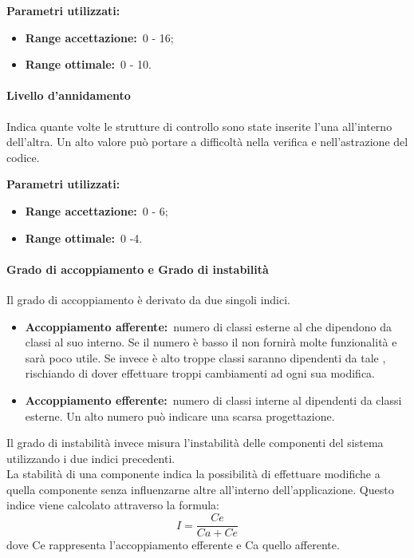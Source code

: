 				\textbf{Parametri utilizzati:}
				\begin{itemize}
					\item \textbf{Range accettazione:}\ 0 - 16;
					\item \textbf{Range ottimale:}\ 0 - 10.
				\end{itemize}
			\paragraph{Livello d'annidamento}
			\label{sec:3.7.3.4}
				Indica quante volte le strutture di controllo sono state inserite l'una all'interno dell'altra. Un alto valore può portare a difficoltà nella verifica e nell'astrazione del codice.
				
				\textbf{Parametri utilizzati:}
				\begin{itemize}
					\item \textbf{Range accettazione:}\ 0 - 6;
					\item \textbf{Range ottimale:}\ 0 -4.
				\end{itemize}
			\paragraph{Grado di accoppiamento e Grado di instabilità}
			\label{sec:3.7.3.5}
				Il grado di accoppiamento è derivato da due singoli indici.
				\begin{itemize}
					\item \textbf{Accoppiamento afferente:}\ numero di classi esterne al  che dipendono da classi al suo interno. Se il numero è basso il  non fornirà molte funzionalità e sarà poco utile. Se invece è alto troppe classi saranno dipendenti da tale , rischiando di dover effettuare troppi cambiamenti ad ogni sua modifica.
					
					\item \textbf{Accoppiamento efferente:}\ numero di classi interne al  dipendenti da classi esterne. Un alto numero può indicare una scarsa progettazione.
					
				\end{itemize}
				Il grado di instabilità invece misura l'instabilità delle componenti del sistema utilizzando i due indici precedenti. \\
				La stabilità di una componente indica la possibilità di effettuare modifiche a quella componente senza influenzarne altre all'interno dell'applicazione. Questo indice viene calcolato attraverso la formula:
				\[I=\frac{Ce}{Ca+Ce}\]
				dove Ce rappresenta l'accoppiamento efferente e Ca quello afferente.
				
